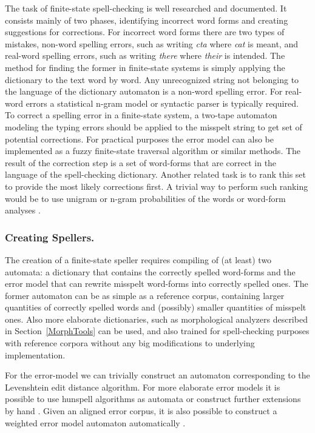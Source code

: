 \documentclass{llncs}
\begin{document}
The task of finite-state spell-checking is well researched and documented. It
consists mainly of two phases, identifying incorrect word forms and creating
suggestions for corrections. For incorrect word forms there are two types of
mistakes, non-word spelling errors, such as writing \emph{cta} where \emph{cat}
is meant, and real-word spelling errors, such as writing \emph{there} where
\emph{their} is intended. The method for finding the former in finite-state systems
is simply applying the dictionary to the text word by word. Any unrecognized
string not belonging to the language of the dictionary automaton is a non-word
spelling error. For real-word errors a statistical n-gram model or syntactic
parser is typically required. To correct a spelling error in a finite-state
system, a two-tape automaton modeling the typing errors should be applied to
the misspelt string to get set of potential corrections\cite{pirinen/2010/lrec}.
For practical purposes the error model can also be implemented as a
fuzzy finite-state traversal algorithm or similar methods\cite{oflazer/1996}. The result
of the correction step is a set of word-forms that are correct in the
language of the spell-checking dictionary. Another related task is to rank this
set to provide the most likely corrections first.
A trivial way to perform such ranking would be to use
unigram \cite{pirinen/2010/lrec} or n-gram probabilities of the words 
\cite{mays/1991} or word-form analyses \cite{pirinen/2012/cicling}.

\subsubsection{Creating Spellers.}

The creation of a finite-state speller requires compiling of (at least) two
automata: a dictionary that contains the correctly spelled word-forms and the
error model that can rewrite misspelt word-forms into correctly spelled ones.
The former automaton can be as simple as a reference corpus, containing larger
quantities of correctly spelled words and (possibly) smaller quantities of
misspelt ones\cite{norvig/2010}. Also more elaborate dictionaries, such as
morphological analyzers described in Section~\ref{MorphTools} can be used, and also
trained for spell-checking purposes with reference corpora without any big
modifications to underlying implementation\cite{pirinen/2010/lrec}.

For the error-model we can trivially construct an automaton corresponding to
the Levenshtein edit distance algorithm\cite{oflazer/1996,agata/2002}. For more elaborate error models
it is possible to use hunspell algorithms as automata \cite{pirinen/2010/il} or
construct further extensions by hand \cite{pirinen/2010/lrec}. Given an
aligned error corpus, it is also possible to construct a weighted error model
automaton automatically \cite{brill/2000}.
\end{document}
